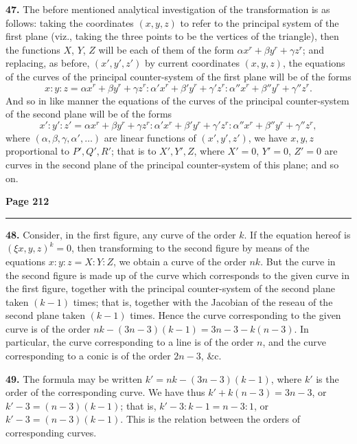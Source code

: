 \documentclass[12pt,a4paper]{article}
\theoremstyle{plain}
\theoremstyle{definition}
\theoremstyle{remark}
\begin{document}
\smallskip

\noindent\textbf{47.} The before mentioned analytical investigation of the transformation is as follows: taking the coordinates $(x, y, z)$ to refer to the principal system of the first plane (viz., taking the three points to be the vertices of the triangle), then the functions $X$, $Y$, $Z$ will be each of them of the form $\alpha x^r + \beta y^r + \gamma z^r$; and replacing, as before, $(x', y', z')$ by current coordinates $(x, y, z)$, the equations of the curves of the principal counter-system of the first plane will be of the forms
\[
x : y : z = \alpha x^r + \beta y^r + \gamma z^r : \alpha' x^r + \beta' y^r + \gamma' z^r : \alpha'' x^r + \beta'' y^r + \gamma'' z^r.
\]
And so in like manner the equations of the curves of the principal counter-system of the second plane will be of the forms
\[
x' : y' : z' = \alpha x^r + \beta y^r + \gamma z^r : \alpha' x^r + \beta' y^r + \gamma' z^r : \alpha'' x^r + \beta'' y^r + \gamma'' z^r,
\]
where $(\alpha, \beta, \gamma, \alpha', \ldots)$ are linear functions of $(x', y', z')$, we have $x, y, z$ proportional to $P', Q', R'$; that is to $X', Y', Z$, where $X' = 0$, $Y' = 0$, $Z' = 0$ are curves in the second plane of the principal counter-system of this plane; and so on.

\newpage
\noindent\textbf{Page 212}\\
\noindent\rule{\textwidth}{0.4pt}

\smallskip

\noindent\textbf{48.} Consider, in the first figure, any curve of the order $k$. If the equation hereof is $(\xi x, y, z)^k = 0$, then transforming to the second figure by means of the equations $x : y : z = X : Y : Z$, we obtain a curve of the order $nk$. But the curve in the second figure is made up of the curve which corresponds to the given curve in the first figure, together with the principal counter-system of the second plane taken $(k - 1)$ times; that is, together with the Jacobian of the reseau of the second plane taken $(k - 1)$ times. Hence the curve corresponding to the given curve is of the order $nk - (3n - 3)(k - 1) = 3n - 3 - k(n - 3)$. In particular, the curve corresponding to a line is of the order $n$, and the curve corresponding to a conic is of the order $2n - 3$, \&c.

\textbf{49.} The formula may be written $k' = nk - (3n - 3)(k - 1)$, where $k'$ is the order of the corresponding curve. We have thus $k' + k(n - 3) = 3n - 3$, or $k' - 3 = (n - 3)(k - 1)$; that is, $k' - 3 : k - 1 = n - 3 : 1$, or $k' - 3 = (n - 3)(k - 1)$. This is the relation between the orders of corresponding curves.
\end{document}
